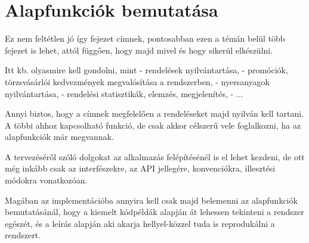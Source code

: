 \chapter{Alapfunkciók bemutatása}

Ez nem feltétlen jó így fejezet címnek, pontosabban ezen a témán belül több fejezet is lehet, attól függően, hogy majd mivel és hogy sikerül elkészülni.

Itt kb. olyasmire kell gondolni, mint
- rendelések nyilvántartása,
- promóciók, törzsvásárlói kedvezmények megvalósítása a rendszerben,
- nyersanyagok nyilvántartása,
- rendelési statisztikák, elemzés, megjelenítés,
- ...

Annyi biztos, hogy a címnek megfelelően a rendeléseket majd nyilván kell tartani. A többi ahhoz kapcsolható funkció, de csak akkor célszerű vele foglalkozni, ha az alapfunkciók már megvannak.

A tervezéséről szóló dolgokat az alkalmazás felépítésénél is el lehet kezdeni, de ott még inkább csak az interfészekre, az API jellegére, konvenciókra, illesztési módokra vonatkozóan.

Magában az implementációba annyira kell csak majd belemenni az alapfunkciók bemutatásánál, hogy a kiemelt kódpéldák alapján át lehessen tekinteni a rendszer egészét, és a leírás alapján aki akarja hellyel-közzel tuda is reprodukálni a rendszert.
